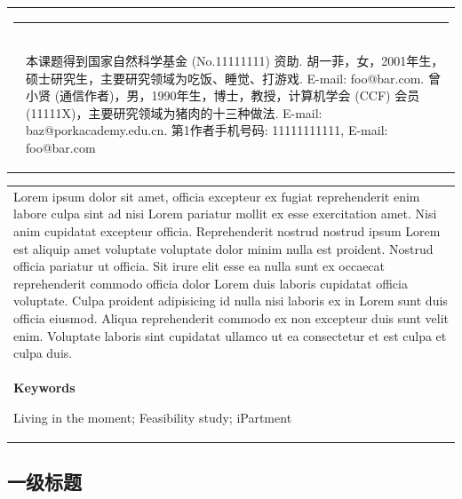 \documentclass[10.5pt, compsoc]{CjC}
\theoremstyle{mystyle}
\begin{document}
\begin{table}[!t]
	\setlength{\tabcolsep}{2pt}
	\begin{tabular}{p{0.05cm}p{16.15cm}}
		\multicolumn{2}{l}{\rule[4mm]{40mm}{0.1mm}} \\[-3mm]
		 & \begin{CJK*}{UTF8}{gbsn}
			   本课题得到国家自然科学基金 (No.11111111) 资助. 胡一菲，女，2001年生，硕士研究生，主要研究领域为吃饭、睡觉、打游戏. E-mail: foo@bar.com. 曾小贤 (通信作者)，男，1990年生，博士，教授，计算机学会 (CCF) 会员 (11111X)，主要研究领域为猪肉的十三种做法. E-mail: baz@porkacademy.edu.cn.
			   第1作者手机号码: 11111111111, E-mail: foo@bar.com
		   \end{CJK*}
	\end{tabular}
\end{table}

\clearpage
\begin{strip}
	\begin{center}
		\vspace{-3em}
		\begin{tabular}{p{160mm}}
			\setlength{\baselineskip}{18pt} Lorem ipsum dolor sit amet, officia excepteur ex fugiat reprehenderit enim labore culpa sint ad nisi Lorem pariatur mollit ex esse exercitation amet. Nisi anim cupidatat excepteur officia. Reprehenderit nostrud nostrud ipsum Lorem est aliquip amet voluptate voluptate dolor minim nulla est proident. Nostrud officia pariatur ut officia. Sit irure elit esse ea nulla sunt ex occaecat reprehenderit commodo officia dolor Lorem duis laboris cupidatat officia voluptate. Culpa proident adipisicing id nulla nisi laboris ex in Lorem sunt duis officia eiusmod. Aliqua reprehenderit commodo ex non excepteur duis sunt velit enim. Voluptate laboris sint cupidatat ullamco ut ea consectetur et est culpa et culpa duis. \\
			\vspace{5mm} {\bf Keywords}\quad \begin{CJK*}{UTF8}{hei} Living in the moment; Feasibility study; iPartment \end{CJK*} \\
		\end{tabular}
	\end{center}
\end{strip}

\newpage
\linespread{1.15}


\begin{CJK*}{UTF8}{hei}  \vskip 1mm \section{一级标题} \end{CJK*}
\end{document}
